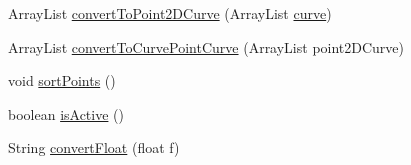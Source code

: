 \begin{DoxyCompactItemize}
\item 
Array\+List \mbox{\hyperlink{classorg_1_1newdawn_1_1slick_1_1tools_1_1peditor_1_1_graph_editor_window_1_1_graph_panel_a6ed82586e275b0b330d382f80dea4c1f}{convert\+To\+Point2\+D\+Curve}} (Array\+List \mbox{\hyperlink{classorg_1_1newdawn_1_1slick_1_1tools_1_1peditor_1_1_graph_editor_window_1_1_graph_panel_ac95a7a77b5e8460041f157c02e19d2bb}{curve}})
\item 
Array\+List \mbox{\hyperlink{classorg_1_1newdawn_1_1slick_1_1tools_1_1peditor_1_1_graph_editor_window_1_1_graph_panel_a65f0d6e1015d241f20ac8af73da4480a}{convert\+To\+Curve\+Point\+Curve}} (Array\+List point2\+D\+Curve)
\item 
void \mbox{\hyperlink{classorg_1_1newdawn_1_1slick_1_1tools_1_1peditor_1_1_graph_editor_window_1_1_graph_panel_a5ba3db2ef0241983db9623b2164bab0f}{sort\+Points}} ()
\item 
boolean \mbox{\hyperlink{classorg_1_1newdawn_1_1slick_1_1tools_1_1peditor_1_1_graph_editor_window_1_1_graph_panel_a49e170e44f2a2f63536807c9decd7ed9}{is\+Active}} ()
\item 
String \mbox{\hyperlink{classorg_1_1newdawn_1_1slick_1_1tools_1_1peditor_1_1_graph_editor_window_1_1_graph_panel_acd99b7572a8b9950eb701f306914eb3c}{convert\+Float}} (float f)
\end{DoxyCompactItemize}
